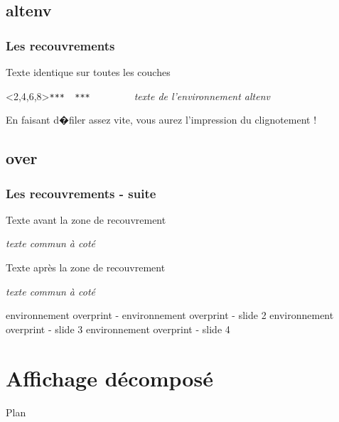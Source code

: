 \documentclass[slidetop,11pt]{beamer}
\begin{document}
\subsection{altenv}
\begin{frame}
\frametitle{Les recouvrements}
  Texte identique sur toutes les couches
  \vfill
  \begin{altenv}<2,4,6,8>{\texttt{***~}}{\texttt{~***}}{\texttt{~~~~}}{\texttt{~~~~}}
   \textit{texte de l'environnement altenv}
  \end{altenv}
  \vfill  
  En faisant d�filer assez vite, vous aurez l'impression du clignotement ! 
\end{frame}

\subsection{over}
\begin{frame}
\frametitle{Les recouvrements - suite}
Texte avant la zone de recouvrement  
  \begin{overlayarea}{8cm}{2.8ex}
   \textit{texte commun à coté}
  \end{overlayarea}
  
Texte après la zone de recouvrement
  \vfill
  \begin{example}
  \begin{overlayarea}{10cm}{1cm}
   \textit{texte commun à coté}
  \end{overlayarea}
  \end{example}
 \vfill
 \begin{overprint}
    environnement overprint - 
    environnement overprint - {\color{blue}slide 2}
    environnement overprint - {\color{blue}slide 3}
    environnement overprint - {\color{blue}slide 4}
 \end{overprint} 
 \end{frame}
 

\section{Affichage décomposé}
\begin{frame}{Plan}
  \begin{columns}[t]
  \begin{column}{5cm}
  \tableofcontents[sections={1-4},currentsection, hideothersubsections]
  \end{column}
  \begin{column}{5cm}
  \tableofcontents[sections={5-8},currentsection,hideothersubsections]
  \end{column}
  \end{columns}
\end{frame}
\end{document}
